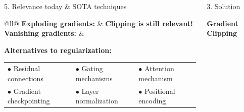\begin{frame}[t]
\begin{columns}[t,totalwidth=\textwidth]
\begin{column}{0.3\textwidth}
\begin{block}{5. Relevance today \& SOTA techniques}
            \begin{tabular}{@{}ll@{}}
                \textbf{Exploding gradients:} & \textbf{Clipping is still relevant!} \\
                \textbf{Vanishing gradients:} & 
                    \begin{minipage}[t]{0.8\textwidth} 
                        \textbf{Alternatives to regularization:}\\[0.3em]
                        \begin{tabular}{@{}lll@{}}
                        $\bullet$ Residual connections     & $\bullet$ Gating mechanisms       & $\bullet$ Attention mechanism \\
                        $\bullet$ Gradient checkpointing   & $\bullet$ Layer normalization     & $\bullet$ Positional encoding \\
                        \end{tabular}
                    \end{minipage} \\
                \end{tabular}
                
                \end{block}
    
\end{column}



    \begin{column}{0.3\textwidth}
        \begin{block}{3. Solution }

        \textbf{Gradient Clipping}
        
    

\end{block}
\end{column}
\end{columns}
\end{frame}
